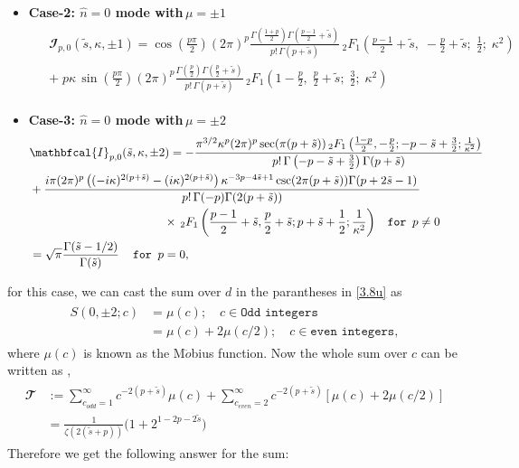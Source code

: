 \documentclass[12 pt]{article}
\begin{document}
\begin{itemize}
 \item \textbf{Case-2: $\hat n=0$ mode with\,$\mu=\pm1$}
\begin{align}
\begin{split} 
&\mathbfcal{I}_{p,0}(\tilde s, \kappa, \pm 1) =
\cos\!\left(\frac{p\pi}{2}\right) (2\pi)^{p} 
\frac{\Gamma\!\left( \frac{1+p}{2} \right) \Gamma\!\left( \frac{p-1}{2} +\tilde  s \right)}{p!\,\Gamma(p+\tilde s)}
\, {}_{2}F_{1}\!\left( \frac{p-1}{2} + \tilde s,\; -\frac{p}{2} +\tilde s;\; \frac{1}{2};\; \kappa^{2} \right)
\quad \\&+\; p\kappa \, \sin\!\left(\frac{p\pi}{2}\right) (2\pi)^{p} 
\frac{\Gamma\!\left( \frac{p}{2} \right) \Gamma\!\left( \frac{p}{2} + \tilde s \right)}{p!\,\Gamma(p+\tilde s)}
\, {}_{2}F_{1}\!\left( 1 - \frac{p}{2},\; \frac{p}{2} +\tilde s;\; \frac{3}{2};\; \kappa^{2} \right)
\end{split}
\end{align}
\item \textbf{Case-3: $\hat n=0$ mode with\,$\mu=\pm2$ }
\begin{align}
\begin{split} 
&\mathbfcal{I}_{p,0}(\tilde s, \kappa, \pm 2) =-\frac{\pi ^{3/2} \kappa ^p (2\pi)^p\sec (\pi  (p+\tilde s)) \, _2F_1\left(\frac{1-p}{2},-\frac{p}{2};-p-\tilde s+\frac{3}{2};\frac{1}{\kappa ^2}\right)}{p!\,\Gamma \left(-p-\tilde s+\frac{3}{2}\right) \Gamma (p+\tilde s)}\\&+\frac{i \pi(2\pi)^p  \left((-i \kappa )^{2 (p+\tilde s)}-(i \kappa )^{2 (p+\tilde s)}\right) \kappa ^{-3 p-4 \tilde s+1} \csc (2 \pi  (p+\tilde s)) \Gamma (p+2 \tilde s-1) \, }{p!\,\Gamma (-p) \Gamma (2 (p+ \tilde s))} \\&\hspace{4 cm}\times \,_2F_1\left(\frac{p-1}{2}+ \tilde s,\frac{p}{2}+\tilde s;p+ \tilde s+\frac{1}{2};\frac{1}{\kappa ^2}\right) \texttt{\,\,\,\,\,for $p \neq 0$}\\&
=\sqrt{\pi}\frac{\Gamma(\tilde s-1/2)}{\Gamma(\tilde s)}\,\,\,\,\,\,\, \texttt{for $p=0$},
\end{split}
\end{align}
\end{itemize}
for this case, we can cast the sum over $d$ in the parantheses in \eqref{3.8u} as
\begin{align}
\begin{split}
     S(0,\pm 2;c)&=\mu(c);\,\,\,\,\,\, c \in \texttt{Odd integers}\\&
=\mu(c)+2\mu(c/2);\,\,\,\,\,\, c \in \texttt{even integers},
\end{split}
\end{align}
where $\mu(c)$ is known as the M$\ddot{o}$bius function.
Now the whole sum over $c$ can be written as ,
\begin{align}
\begin{split}
\mathbfcal{T}&:=\sum_{c_{odd}=1}^\infty c^{-2(p+\tilde s)}\mu(c)+\sum_{c_{even}=2}^\infty c^{-2(p+\tilde s)}[\mu(c)+2\mu(c/2)]\\&=\frac{1}{\zeta(2(\tilde s+p))}\Bigg(1+2^{1-2p-2\tilde s}\Bigg)
\end{split}
\end{align}
\noindent
Therefore we get the following answer for the sum:
\end{document}
